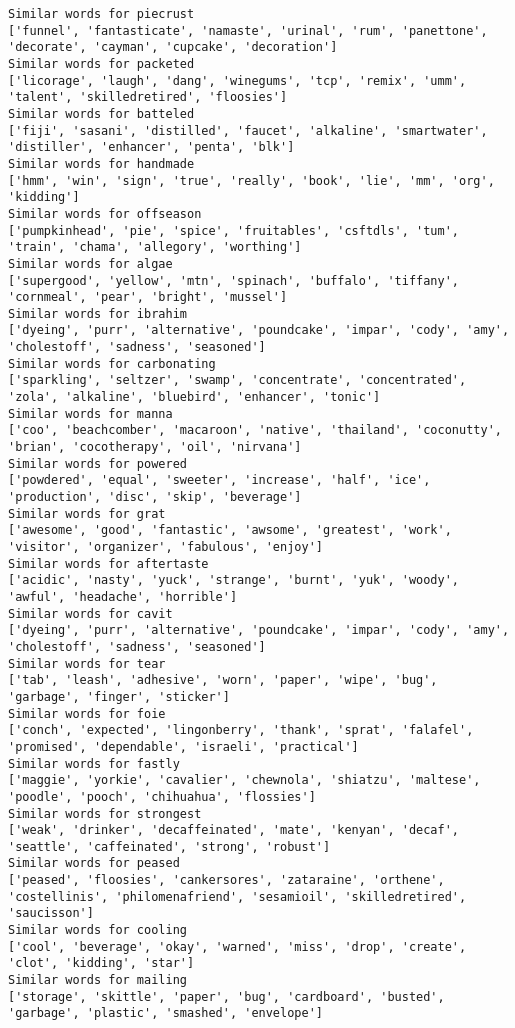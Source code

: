 \documentclass[11pt]{article}
\begin{document}
\begin{Verbatim}[commandchars=\\\{\}]
Similar words for piecrust
['funnel', 'fantasticate', 'namaste', 'urinal', 'rum', 'panettone', 'decorate', 'cayman', 'cupcake', 'decoration']
Similar words for packeted
['licorage', 'laugh', 'dang', 'winegums', 'tcp', 'remix', 'umm', 'talent', 'skilledretired', 'floosies']
Similar words for batteled
['fiji', 'sasani', 'distilled', 'faucet', 'alkaline', 'smartwater', 'distiller', 'enhancer', 'penta', 'blk']
Similar words for handmade
['hmm', 'win', 'sign', 'true', 'really', 'book', 'lie', 'mm', 'org', 'kidding']
Similar words for offseason
['pumpkinhead', 'pie', 'spice', 'fruitables', 'csftdls', 'tum', 'train', 'chama', 'allegory', 'worthing']
Similar words for algae
['supergood', 'yellow', 'mtn', 'spinach', 'buffalo', 'tiffany', 'cornmeal', 'pear', 'bright', 'mussel']
Similar words for ibrahim
['dyeing', 'purr', 'alternative', 'poundcake', 'impar', 'cody', 'amy', 'cholestoff', 'sadness', 'seasoned']
Similar words for carbonating
['sparkling', 'seltzer', 'swamp', 'concentrate', 'concentrated', 'zola', 'alkaline', 'bluebird', 'enhancer', 'tonic']
Similar words for manna
['coo', 'beachcomber', 'macaroon', 'native', 'thailand', 'coconutty', 'brian', 'cocotherapy', 'oil', 'nirvana']
Similar words for powered
['powdered', 'equal', 'sweeter', 'increase', 'half', 'ice', 'production', 'disc', 'skip', 'beverage']
Similar words for grat
['awesome', 'good', 'fantastic', 'awsome', 'greatest', 'work', 'visitor', 'organizer', 'fabulous', 'enjoy']
Similar words for aftertaste
['acidic', 'nasty', 'yuck', 'strange', 'burnt', 'yuk', 'woody', 'awful', 'headache', 'horrible']
Similar words for cavit
['dyeing', 'purr', 'alternative', 'poundcake', 'impar', 'cody', 'amy', 'cholestoff', 'sadness', 'seasoned']
Similar words for tear
['tab', 'leash', 'adhesive', 'worn', 'paper', 'wipe', 'bug', 'garbage', 'finger', 'sticker']
Similar words for foie
['conch', 'expected', 'lingonberry', 'thank', 'sprat', 'falafel', 'promised', 'dependable', 'israeli', 'practical']
Similar words for fastly
['maggie', 'yorkie', 'cavalier', 'chewnola', 'shiatzu', 'maltese', 'poodle', 'pooch', 'chihuahua', 'flossies']
Similar words for strongest
['weak', 'drinker', 'decaffeinated', 'mate', 'kenyan', 'decaf', 'seattle', 'caffeinated', 'strong', 'robust']
Similar words for peased
['peased', 'floosies', 'cankersores', 'zataraine', 'orthene', 'costellinis', 'philomenafriend', 'sesamioil', 'skilledretired', 'saucisson']
Similar words for cooling
['cool', 'beverage', 'okay', 'warned', 'miss', 'drop', 'create', 'clot', 'kidding', 'star']
Similar words for mailing
['storage', 'skittle', 'paper', 'bug', 'cardboard', 'busted', 'garbage', 'plastic', 'smashed', 'envelope']

\end{Verbatim}
\end{document}
